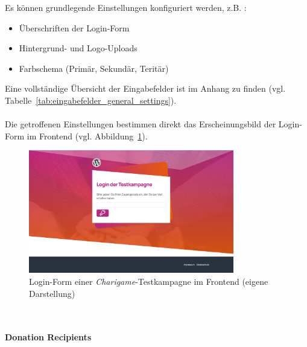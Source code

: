 Es können grundlegende Einstellungen konfiguriert werden, z.B. :
\begin{itemize}
\item Überschriften der Login-Form
\item Hintergrund- und Logo-Uploads
\item Farbschema (Primär, Sekundär, Teritär)
\end{itemize}
Eine vollständige Übersicht der Eingabefelder ist im Anhang zu finden (vgl. Tabelle~\ref{tab:eingabefelder_general_settings}).
\\\\
Die getroffenen Einstellungen bestimmen direkt das Erscheinungsbild der Login-Form im Frontend (vgl. Abbildung~\ref{fig:login-textkampagne}).

\begin{figure}[H]
    \centering
    \includegraphics[width=0.8\textwidth]{images/legacy_login_testkampagne}
    \caption{Login-Form einer \textit{Charigame}-Testkampagne im Frontend (eigene Darstellung)}
    \label{fig:login-textkampagne}
\end{figure}
\\\\
\textbf{Donation Recipients}


